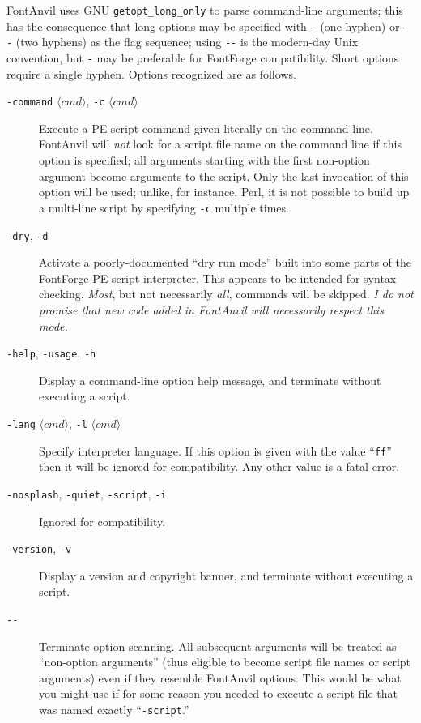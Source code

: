 \documentclass[11pt]{report}
\begin{document}
FontAnvil uses GNU \texttt{getopt\_long\_only} to parse command-line
arguments; this has the consequence that long options may be specified with
\texttt{-} (one hyphen) or \texttt{-{}-} (two hyphens) as the flag sequence;
using \texttt{-{}-} is the modern-day Unix convention, but \texttt{-} may be
preferable for FontForge compatibility.  Short options require a single
hyphen.  Options recognized are as follows.

\begin{description}
  \item[\texttt{-command} $\langle cmd\rangle$,
    \texttt{-c} $\langle cmd\rangle$]
  Execute a PE script command given literally on the command line.  FontAnvil
  will \emph{not} look for a script file name on the command line if this
  option is specified; all arguments starting with the first non-option
  argument become arguments to the script.  Only the last invocation of this
  option will be used; unlike, for instance, Perl, it is not possible to
  build up a multi-line script by specifying \texttt{-c} multiple times.

  \item[\texttt{-dry}, \texttt{-d}]
  Activate a poorly-documented ``dry run mode'' built into some parts of
  the FontForge PE script interpreter.  This appears to
  be intended for syntax checking.  \emph{Most}, but not necessarily
  \emph{all}, commands will be skipped.  \emph{I do not promise that new
  code added in FontAnvil will necessarily respect this mode.}

  \item[\texttt{-help}, \texttt{-usage}, \texttt{-h}]
  Display a command-line option help message, and terminate without
  executing a script.

  \item[\texttt{-lang} $\langle cmd\rangle$,
    \texttt{-l} $\langle cmd\rangle$]
  Specify interpreter language.  If this option is given with the value
  ``\texttt{ff}'' then it will be ignored for compatibility.  Any other
  value is a fatal error.

  \item[\texttt{-nosplash}, \texttt{-quiet}, \texttt{-script}, \texttt{-i}]
  Ignored for compatibility.

  \item[\texttt{-version}, \texttt{-v}]
  Display a version and copyright banner, and terminate without executing a
  script.

  \item[\texttt{-{}-}]
  Terminate option scanning.  All subsequent arguments will be treated as
  ``non-option arguments'' (thus eligible to become script file names or
  script arguments) even if they resemble FontAnvil options.  This would be
  what you might use if for some reason you needed to execute a script file
  that was named exactly ``\texttt{-script}.''
\end{description}
\end{document}
